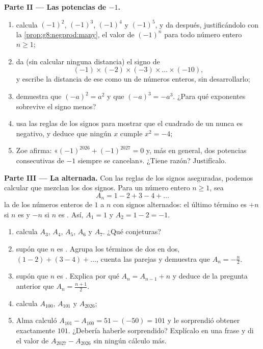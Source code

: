 \begin{problem}
\medskip
\noindent\textbf{Parte II --- Las potencias de $-1$.}
\begin{enumerate}[resume]
  \item calcula $(-1)^2$, $(-1)^3$, $(-1)^4$ y $(-1)^5$, y da después,
        justificándolo con la \cref{prop:g8:negprod:many}, el
        valor de $(-1)^n$ para todo número entero $n \geq 1$;
  \item da (sin calcular ninguna distancia) el signo de
        \[
        (-1) \times (-2) \times (-3) \times \dots \times (-10),
        \]
        y escribe la distancia de ese  como un  de números
        enteros, sin desarrollarlo;
  \item demuestra que $(-a)^2 = a^2$ y que $(-a)^3 = -a^3$. ¿Para qué
        exponentes sobrevive el signo menos?
  \item usa las reglas de los signos para mostrar que el cuadrado de un  nunca es negativo, y deduce que ningún 
        $x$ cumple $x^2 = -4$;
  \item Zoe afirma: «$(-1)^{2026} + (-1)^{2027} = 0$ y, más en
        general, dos potencias consecutivas de $-1$ siempre se cancelan». ¿Tiene
        razón? Justifícalo.
\end{enumerate}

\medskip
\noindent\textbf{Parte III --- La  alternada.}
Con las reglas de los signos aseguradas, podemos calcular  que mezclan los dos
signos. Para un número entero $n \geq 1$, sea
\[
A_n = 1 - 2 + 3 - 4 + \dots
\]
la  de los números enteros de $1$ a $n$ con signos
alternados: el último término es $+n$ si $n$ es  y $-n$ si $n$ es
. Así, $A_1 = 1$ y $A_2 = 1 - 2 = -1$.
\begin{enumerate}[resume]
  \item calcula $A_3$, $A_4$, $A_5$, $A_6$ y $A_7$. ¿Qué
        conjeturas?
  \item supón que $n$ es . Agrupa los términos de dos en dos,
        $(1 - 2) + (3 - 4) + \dots$, cuenta las parejas y demuestra que
        $A_n = -\frac{n}{2}$.
  \item supón que $n$ es . Explica por qué $A_n = A_{n-1} + n$ y
        deduce de la pregunta anterior que
        $A_n = \frac{n + 1}{2}$.
  \item calcula $A_{100}$, $A_{101}$ y $A_{2026}$;
  \item Alma calculó $A_{101} - A_{100} = 51 - (-50) = 101$ y le
        sorprendió obtener exactamente $101$. ¿Debería haberle sorprendido?
        Explícalo en una frase y di el valor de
        $A_{2027} - A_{2026}$ sin ningún cálculo más.
\end{enumerate}
\end{problem}
